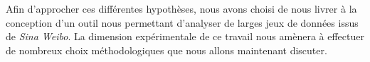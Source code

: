 \bigskip

Afin d{\textquoteright}approcher ces différentes hypothèses, nous avons choisi de nous livrer à la conception d'un outil nous permettant d'analyser de larges jeux de données issus de \textit{Sina Weibo}. La dimension expérimentale de ce travail nous amènera à effectuer de nombreux choix méthodologiques que nous allons maintenant discuter.
